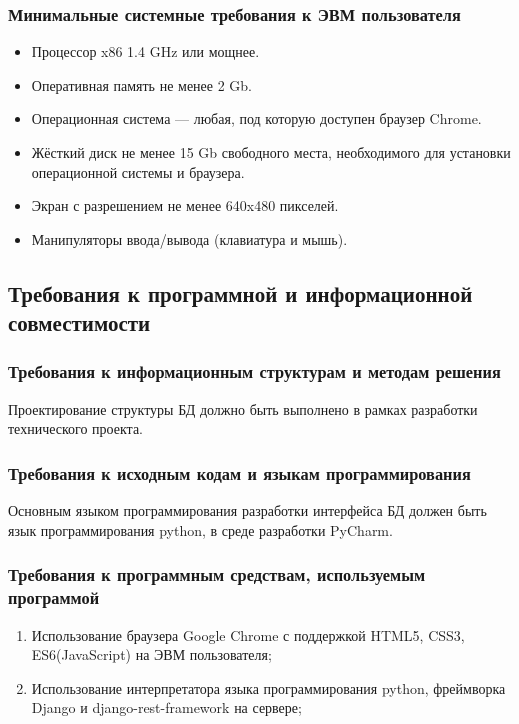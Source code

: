     \subsubsection{Минимальные системные требования к ЭВМ пользователя}
      \begin{itemize}
        \item Процессор x86 1.4 GHz или мощнее.
        \item Оперативная память не менее 2 Gb.
        \item Операционная система — любая, под которую доступен браузер Chrome.
        \item Жёсткий диск не менее 15 Gb свободного места, необходимого для установки операционной системы и браузера.
        \item Экран с разрешением не менее 640x480 пикселей.
        \item Манипуляторы ввода/вывода (клавиатура и мышь).
      \end{itemize}
  \subsection{Требования к программной и информационной совместимости}
    \subsubsection{Требования к информационным структурам и методам решения}
      Проектирование структуры БД должно быть выполнено в рамках разработки технического проекта.
    \subsubsection{Требования к исходным кодам и языкам программирования}
      Основным языком программирования разработки интерфейса БД должен быть язык программирования python, в среде разработки PyCharm.
    \subsubsection{Требования к программным средствам, используемым программой}
    \begin{enumerate}
      \item Использование браузера Google Chrome с поддержкой HTML5, CSS3, ES6(JavaScript) на ЭВМ пользователя;
      \item Использование интерпретатора языка программирования python, фреймворка Django и django-rest-framework на сервере; 
    \end{enumerate}
